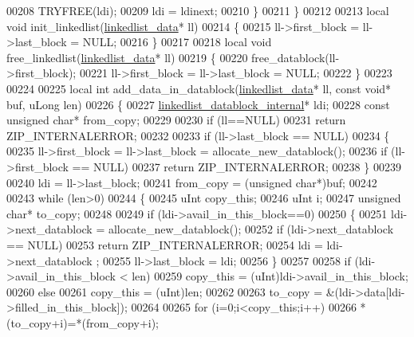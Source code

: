 \begin{DoxyCode}
00208         TRYFREE(ldi);
00209         ldi = ldinext;
00210     \}
00211 \}
00212 
00213 local \textcolor{keywordtype}{void} init\_linkedlist(\hyperlink{structlinkedlist__data__s}{linkedlist\_data}* ll)
00214 \{
00215     ll->first\_block = ll->last\_block = NULL;
00216 \}
00217 
00218 local \textcolor{keywordtype}{void} free\_linkedlist(\hyperlink{structlinkedlist__data__s}{linkedlist\_data}* ll)
00219 \{
00220     free\_datablock(ll->first\_block);
00221     ll->first\_block = ll->last\_block = NULL;
00222 \}
00223 
00224 
00225 local \textcolor{keywordtype}{int} add\_data\_in\_datablock(\hyperlink{structlinkedlist__data__s}{linkedlist\_data}* ll, \textcolor{keyword}{const} \textcolor{keywordtype}{void}* buf, uLong len)
00226 \{
00227     \hyperlink{structlinkedlist__datablock__internal__s}{linkedlist\_datablock\_internal}* ldi;
00228     \textcolor{keyword}{const} \textcolor{keywordtype}{unsigned} \textcolor{keywordtype}{char}* from\_copy;
00229 
00230     \textcolor{keywordflow}{if} (ll==NULL)
00231         \textcolor{keywordflow}{return} ZIP\_INTERNALERROR;
00232 
00233     \textcolor{keywordflow}{if} (ll->last\_block == NULL)
00234     \{
00235         ll->first\_block = ll->last\_block = allocate\_new\_datablock();
00236         \textcolor{keywordflow}{if} (ll->first\_block == NULL)
00237             \textcolor{keywordflow}{return} ZIP\_INTERNALERROR;
00238     \}
00239 
00240     ldi = ll->last\_block;
00241     from\_copy = (\textcolor{keywordtype}{unsigned} \textcolor{keywordtype}{char}*)buf;
00242 
00243     \textcolor{keywordflow}{while} (len>0)
00244     \{
00245         uInt copy\_this;
00246         uInt i;
00247         \textcolor{keywordtype}{unsigned} \textcolor{keywordtype}{char}* to\_copy;
00248 
00249         \textcolor{keywordflow}{if} (ldi->avail\_in\_this\_block==0)
00250         \{
00251             ldi->next\_datablock = allocate\_new\_datablock();
00252             \textcolor{keywordflow}{if} (ldi->next\_datablock == NULL)
00253                 \textcolor{keywordflow}{return} ZIP\_INTERNALERROR;
00254             ldi = ldi->next\_datablock ;
00255             ll->last\_block = ldi;
00256         \}
00257 
00258         \textcolor{keywordflow}{if} (ldi->avail\_in\_this\_block < len)
00259             copy\_this = (uInt)ldi->avail\_in\_this\_block;
00260         \textcolor{keywordflow}{else}
00261             copy\_this = (uInt)len;
00262 
00263         to\_copy = &(ldi->data[ldi->filled\_in\_this\_block]);
00264 
00265         \textcolor{keywordflow}{for} (i=0;i<copy\_this;i++)
00266             *(to\_copy+i)=*(from\_copy+i);

\end{DoxyCode}
